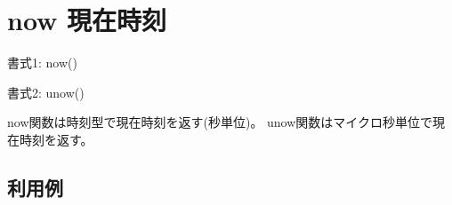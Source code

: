 
%

\section{now 現在時刻\label{sect:now}}

書式1: now()

書式2: unow()

now関数は時刻型で現在時刻を返す(秒単位)。
unow関数はマイクロ秒単位で現在時刻を返す。

\subsection*{利用例}


%

